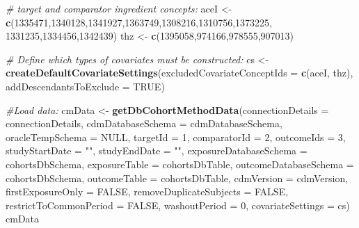 \documentclass[11pt]{book}
\newenvironment{Shaded}{\begin{snugshade}}{\end{snugshade}}
\newcommand{\KeywordTok}[1]{\textcolor[rgb]{0.13,0.29,0.53}{\textbf{#1}}}
\newcommand{\DataTypeTok}[1]{\textcolor[rgb]{0.13,0.29,0.53}{#1}}
\newcommand{\DecValTok}[1]{\textcolor[rgb]{0.00,0.00,0.81}{#1}}
\newcommand{\StringTok}[1]{\textcolor[rgb]{0.31,0.60,0.02}{#1}}
\newcommand{\CommentTok}[1]{\textcolor[rgb]{0.56,0.35,0.01}{\textit{#1}}}
\newcommand{\OtherTok}[1]{\textcolor[rgb]{0.56,0.35,0.01}{#1}}
\newcommand{\NormalTok}[1]{#1}
\begin{document}
\begin{Shaded}
\begin{Highlighting}[]
\CommentTok{# target and comparator ingredient concepts:}
\NormalTok{aceI <-}\StringTok{ }\KeywordTok{c}\NormalTok{(}\DecValTok{1335471}\NormalTok{,}\DecValTok{1340128}\NormalTok{,}\DecValTok{1341927}\NormalTok{,}\DecValTok{1363749}\NormalTok{,}\DecValTok{1308216}\NormalTok{,}\DecValTok{1310756}\NormalTok{,}\DecValTok{1373225}\NormalTok{,}
          \DecValTok{1331235}\NormalTok{,}\DecValTok{1334456}\NormalTok{,}\DecValTok{1342439}\NormalTok{)}
\NormalTok{thz <-}\StringTok{ }\KeywordTok{c}\NormalTok{(}\DecValTok{1395058}\NormalTok{,}\DecValTok{974166}\NormalTok{,}\DecValTok{978555}\NormalTok{,}\DecValTok{907013}\NormalTok{)}

\CommentTok{# Define which types of covariates must be constructed:}
\NormalTok{cs <-}\StringTok{ }\KeywordTok{createDefaultCovariateSettings}\NormalTok{(}\DataTypeTok{excludedCovariateConceptIds =} \KeywordTok{c}\NormalTok{(aceI, }
\NormalTok{                                                                     thz),}
                                     \DataTypeTok{addDescendantsToExclude =} \OtherTok{TRUE}\NormalTok{)}

\CommentTok{#Load data:}
\NormalTok{cmData <-}\StringTok{ }\KeywordTok{getDbCohortMethodData}\NormalTok{(}\DataTypeTok{connectionDetails =}\NormalTok{ connectionDetails,}
                                \DataTypeTok{cdmDatabaseSchema =}\NormalTok{ cdmDatabaseSchema,}
                                \DataTypeTok{oracleTempSchema =} \OtherTok{NULL}\NormalTok{,}
                                \DataTypeTok{targetId =} \DecValTok{1}\NormalTok{,}
                                \DataTypeTok{comparatorId =} \DecValTok{2}\NormalTok{,}
                                \DataTypeTok{outcomeIds =} \DecValTok{3}\NormalTok{,}
                                \DataTypeTok{studyStartDate =} \StringTok{""}\NormalTok{,}
                                \DataTypeTok{studyEndDate =} \StringTok{""}\NormalTok{,}
                                \DataTypeTok{exposureDatabaseSchema =}\NormalTok{ cohortsDbSchema,}
                                \DataTypeTok{exposureTable =}\NormalTok{ cohortsDbTable,}
                                \DataTypeTok{outcomeDatabaseSchema =}\NormalTok{ cohortsDbSchema,}
                                \DataTypeTok{outcomeTable =}\NormalTok{ cohortsDbTable,}
                                \DataTypeTok{cdmVersion =}\NormalTok{ cdmVersion,}
                                \DataTypeTok{firstExposureOnly =} \OtherTok{FALSE}\NormalTok{,}
                                \DataTypeTok{removeDuplicateSubjects =} \OtherTok{FALSE}\NormalTok{,}
                                \DataTypeTok{restrictToCommonPeriod =} \OtherTok{FALSE}\NormalTok{,}
                                \DataTypeTok{washoutPeriod =} \DecValTok{0}\NormalTok{,}
                                \DataTypeTok{covariateSettings =}\NormalTok{ cs)}
\NormalTok{cmData}
\end{Highlighting}
\end{Shaded}
\end{document}
